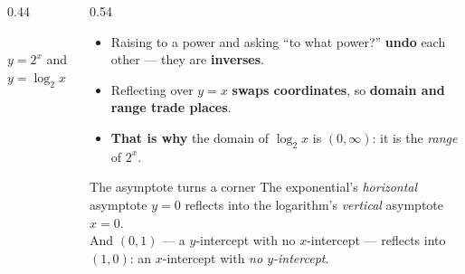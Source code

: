 \documentclass[aspectratio=169, 11pt]{beamer}
\newcommand{\lgrid}[4]{%
  \draw[step=1, linegray!45, thin] (#1,#3) grid (#2,#4);
  \draw[->, thick, charcoal] (#1,0)--(#2,0) node[below right, font=\tiny]{$x$};
  \draw[->, thick, charcoal] (0,#3)--(0,#4) node[left, font=\tiny]{$y$};}
\newcommand{\logcurve}[5]{\draw[very thick, forest, domain=#4:#5, samples=120, smooth]
  plot ({pow(#1,\x-(#3))+(#2)},{\x});}
\begin{document}
\begin{frame}[t, plain]
  \begin{columns}[T]
    \begin{column}{0.44\textwidth}
      \centering
      \\[2pt]
      {\footnotesize \textcolor{goldacc}{$y=2^x$} \; and \; \textcolor{forest}{$y=\log_2 x$}}
    \end{column}
    \begin{column}{0.54\textwidth}
      \footnotesize
      \begin{itemize}\setlength{\itemsep}{3pt}
        \item Raising to a power and asking ``to what power?'' \textbf{undo} each other --- they are
              \textbf{inverses}.
        \item Reflecting over $y=x$ \textbf{swaps coordinates}, so \textbf{domain and range trade
              places}.
        \item \textbf{That is why} the domain of $\log_2 x$ is $(0,\infty)$: it is the \emph{range}
              of $2^x$.
      \end{itemize}
      \vspace{2pt}
      \begin{block}{The asymptote turns a corner}
        The exponential's \emph{horizontal} asymptote $y=0$ reflects into the logarithm's
        \emph{vertical} asymptote $x=0$. \\[3pt]
        And $(0,1)$ --- a $y$-intercept with no $x$-intercept --- reflects into $(1,0)$: an
        $x$-intercept with \emph{no $y$-intercept}.
      \end{block}
    \end{column}
  \end{columns}
\end{frame}
\end{document}
